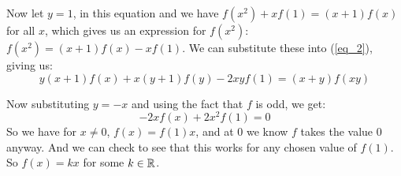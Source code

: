 \documentclass[a4paper,12pt,fleqn]{article}
\begin{document}
\begin{enumerate}
  Now let \(y = 1\), in this equation and we have
  \(f(x^2) + xf(1) = (x+1)f(x)\) for all \(x\), which gives us an expression for
  \(f(x^2)\): \(f(x^2) = (x+1)f(x) - xf(1)\). We can substitute these into
  (\ref{eq_2}), giving us:
  \begin{equation*}
   y(x+1)f(x) + x(y+1)f(y) - 2xyf(1) = (x+y)f(xy)
  \end{equation*}

  Now substituting \(y = -x\) and using the fact that \(f\) is odd, we get:
  \begin{equation*}
    -2xf(x) + 2x^2f(1) = 0
  \end{equation*}
  So we have for \(x \neq 0\), \(f(x) = f(1)x\), and at \(0\) we know \(f\)
  takes the value \(0\) anyway. And we can check to see that this works for any
  chosen value of \(f(1)\). So \(f(x) = kx\) for some \(k \in \mathbb R\).
\end{enumerate}
\end{document}
